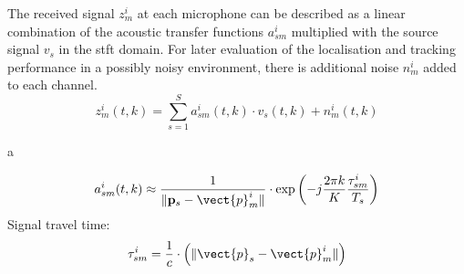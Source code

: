 The received signal $z^i_m$ at each microphone can be described as a linear combination of the acoustic transfer functions $a^i_{sm}$ multiplied with the source signal $v_s$ in the \acrfull{stft} domain. For later evaluation of the localisation and tracking performance in a possibly noisy environment, there is additional noise $n^i_m$ added to each channel.
\begin{equation}
	z_m^i(t,k)=\sum_{s=1}^{S}a_{sm}^i(t,k)\cdot v_s(t,k)+n_m^i(t,k)
	\label{eq:received_signal}
\end{equation}

	a

\begin{equation}
	a_{sm}^i(t,k)\approx\frac{1}{\|\mathbf{p}_s-\vect{p}_m^i\|}\cdot\exp{\left(-j\frac{2\pi k}{K}\frac{\tau^i_{sm}}{T_s}\right)}
	\label{eq:acoustic_transfer_function}
\end{equation}
Signal travel time:
\begin{equation}
	\tau^i_{sm}=\frac{1}{c}\cdot\left(\|\vect{p}_s-\vect{p}_m^i\|\right)
\end{equation}